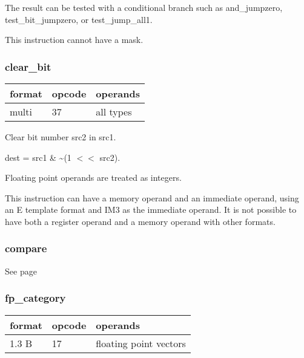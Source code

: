 \documentclass[forwardcom.tex]{subfiles}
\begin{document}
The result can be tested with a conditional branch such as and\_jumpzero, test\_bit\_jumpzero, or test\_jump\_all1.
\vspace{2mm}

This instruction cannot have a mask.

\subsubsection{clear\_bit}
\label{table:clearBitInstruction}
\begin{tabular}{|p{12mm}|p{12mm}|p{110mm}|}
\hline
\bfseries format & \bfseries opcode & \bfseries operands \\ \hline
multi & 37 & all types \\ \hline
\end{tabular}
\vspace{2mm}

Clear bit number src2 in src1.
\vspace{2mm}

dest = src1 \& \~{}(1 $<<$ src2).

\vspace{2mm}
Floating point operands are treated as integers.

\vspace{2mm}
This instruction can have a memory operand and an immediate operand, using an E template format and IM3 as the immediate operand. It is not possible to have both a register operand and a memory operand with other formats.
\vspace{2mm}

\subsubsection{compare}
See page \pageref{table:compareInstruction}
\vspace{2mm}

\subsubsection{fp\_category}
\label{table:fpCategoryInstruction}
\begin{tabular}{|p{12mm}|p{12mm}|p{110mm}|}
\hline
\bfseries format & \bfseries opcode & \bfseries operands \\ \hline
1.3 B & 17 & floating point vectors \\ \hline
\end{tabular}
\vspace{2mm}
\end{document}

